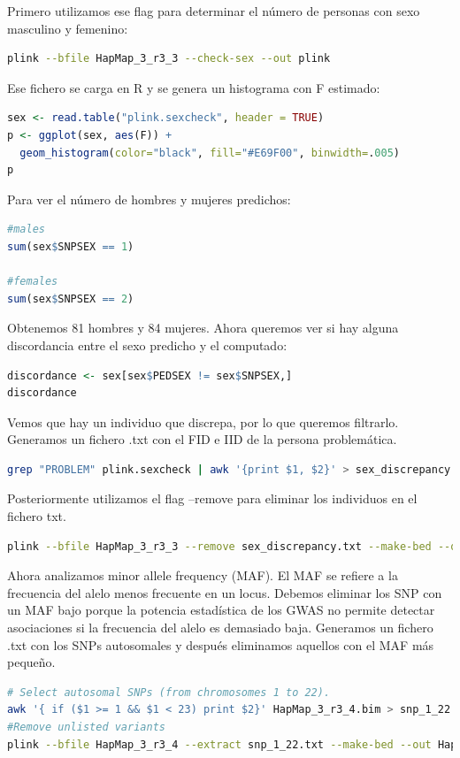 Primero utilizamos ese flag para determinar el número de personas con sexo masculino y femenino:
\begin{lstlisting}[language=bash]
plink --bfile HapMap_3_r3_3 --check-sex --out plink
\end{lstlisting}

Ese fichero se carga en R y se genera un histograma con F estimado:
\begin{lstlisting}[language=R]
sex <- read.table("plink.sexcheck", header = TRUE)
p <- ggplot(sex, aes(F)) +
  geom_histogram(color="black", fill="#E69F00", binwidth=.005)
p
\end{lstlisting}

Para ver el número de hombres y mujeres predichos:
\begin{lstlisting}[language=R]
#males
sum(sex$SNPSEX == 1)

#females
sum(sex$SNPSEX == 2)
\end{lstlisting}
Obtenemos 81 hombres y 84 mujeres. Ahora queremos ver si hay alguna discordancia entre el sexo predicho y el computado:
\begin{lstlisting}[language=R]
discordance <- sex[sex$PEDSEX != sex$SNPSEX,]
discordance
\end{lstlisting}

Vemos que hay un individuo que discrepa, por lo que queremos filtrarlo. Generamos un fichero .txt con el FID e IID de la persona problemática.
\begin{lstlisting}[language=bash]
grep "PROBLEM" plink.sexcheck | awk '{print $1, $2}' > sex_discrepancy.txt
\end{lstlisting}

Posteriormente utilizamos el flag --remove para eliminar los individuos en el fichero txt.
\begin{lstlisting}[language=bash]
plink --bfile HapMap_3_r3_3 --remove sex_discrepancy.txt --make-bed --out HapMap_3_r3_4
\end{lstlisting}

Ahora analizamos minor allele frequency (MAF). El MAF se refiere a la frecuencia del alelo menos frecuente en un locus. Debemos eliminar los SNP con un MAF bajo porque la potencia estadística de los GWAS no permite detectar asociaciones si la frecuencia del alelo es demasiado baja. Generamos un fichero .txt con los SNPs autosomales y después eliminamos aquellos con el MAF más pequeño. 
\begin{lstlisting}[language=bash]
# Select autosomal SNPs (from chromosomes 1 to 22).
awk '{ if ($1 >= 1 && $1 < 23) print $2}' HapMap_3_r3_4.bim > snp_1_22.txt
#Remove unlisted variants
plink --bfile HapMap_3_r3_4 --extract snp_1_22.txt --make-bed --out HapMap_3_r3_5
\end{lstlisting}

